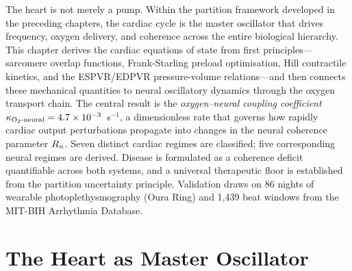 \begin{chapterabstract}
The heart is not merely a pump. Within the partition framework developed
in the preceding chapters, the cardiac cycle is the master oscillator
that drives frequency, oxygen delivery, and coherence across the entire
biological hierarchy. This chapter derives the cardiac equations of state
from first principles---sarcomere overlap functions, Frank-Starling
preload optimisation, Hill contractile kinetics, and the
ESPVR/EDPVR pressure-volume relations---and then connects these
mechanical quantities to neural oscillatory dynamics through the
oxygen transport chain. The central result is the \emph{oxygen--neural
coupling coefficient} $\kappa_{\mathrm{O_2\text{-}neural}} = 4.7\times 10^{-3}$~s$^{-1}$, a
dimensionless rate that governs how rapidly cardiac output perturbations
propagate into changes in the neural coherence parameter $R_n$. Seven
distinct cardiac regimes are classified; five corresponding neural regimes
are derived. Disease is formulated as a coherence deficit quantifiable
across both systems, and a universal therapeutic floor is established from
the partition uncertainty principle. Validation draws on 86 nights of
wearable photoplethysmography (Oura Ring) and 1{,}439 beat windows from
the MIT-BIH Arrhythmia Database.
\end{chapterabstract}

\section{The Heart as Master Oscillator}
\label{sec:ch09-master}

